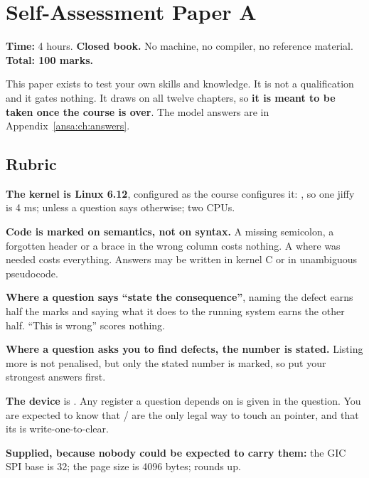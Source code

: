 
\chapter{Self-Assessment Paper A}
\label{exa:ch:paper}

\textbf{Time:} 4 hours. \textbf{Closed book.} No machine, no compiler, no reference material.
\textbf{Total: 100 marks.}

This paper exists to test your own skills and knowledge. It is not a qualification and it gates
nothing. It draws on all twelve chapters, so \textbf{it is meant to be taken once the course is
over}. The model answers are in Appendix~\ref{ansa:ch:answers}.

\section*{Rubric}

\textbf{The kernel is Linux 6.12}, configured as the course configures it: , so one
jiffy is 4 ms;  unless a question says otherwise; two CPUs.

\textbf{Code is marked on semantics, not on syntax.} A missing semicolon, a forgotten header or a
brace in the wrong column costs nothing. A  where  was needed costs
everything. Answers may be written in kernel C or in unambiguous pseudocode.

\textbf{Where a question says ``state the consequence''}, naming the defect earns half the marks and
saying what it does to the running system earns the other half. ``This is wrong'' scores nothing.

\textbf{Where a question asks you to find defects, the number is stated.} Listing more is not
penalised, but only the stated number is marked, so put your strongest answers first.

\textbf{The device} is . Any register a question depends on is given in the question.
You are expected to know that / are the only legal way to touch an
 pointer, and that its  is write-one-to-clear.

\textbf{Supplied, because nobody could be expected to carry them:} the GIC SPI base is 32; the page
size is 4096 bytes;  rounds up.

\label{exa:q:1}

